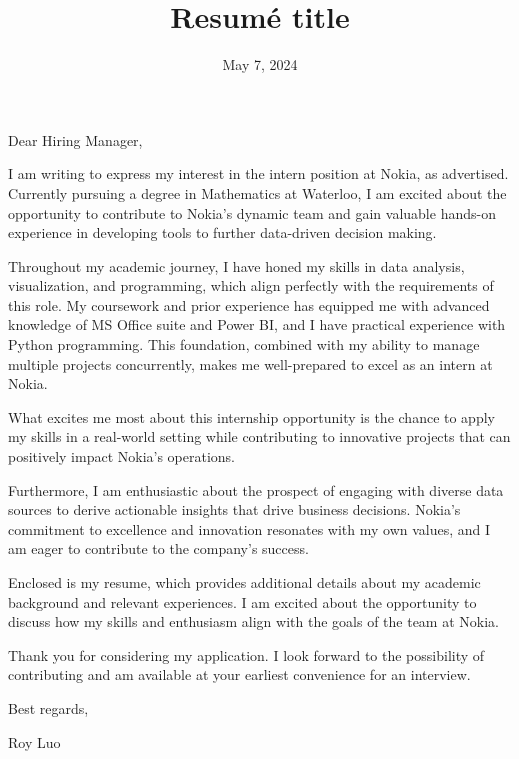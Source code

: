\documentclass[11pt,a4paper,roman]{moderncv}        %
\title{Resumé title}                               %
\date{May 7, 2024}                              %
\begin{document}
\recipient{\phantom{1}}{}
\opening{\phantom{1}}
\closing{\phantom{1}}
\enclosure[\phantom{1}]{\phantom{1}}          %
\makelettertitle

Dear Hiring Manager,

I am writing to express my interest in the intern position at Nokia, as advertised. Currently pursuing a degree in Mathematics at Waterloo, I am excited about the opportunity to contribute to Nokia's dynamic team and gain valuable hands-on experience in developing tools to further data-driven decision making.

Throughout my academic journey, I have honed my skills in data analysis, visualization, and programming, which align perfectly with the requirements of this role. My coursework and prior experience has equipped me with advanced knowledge of MS Office suite and Power BI, and I have practical experience with Python programming. This foundation, combined with my ability to manage multiple projects concurrently, makes me well-prepared to excel as an intern at Nokia.

What excites me most about this internship opportunity is the chance to apply my skills in a real-world setting while contributing to innovative projects that can positively impact Nokia's operations. 

Furthermore, I am enthusiastic about the prospect of engaging with diverse data sources to derive actionable insights that drive business decisions. Nokia's commitment to excellence and innovation resonates with my own values, and I am eager to contribute to the company's success.

Enclosed is my resume, which provides additional details about my academic background and relevant experiences. I am excited about the opportunity to discuss how my skills and enthusiasm align with the goals of the team at Nokia.

Thank you for considering my application. I look forward to the possibility of contributing and am available at your earliest convenience for an interview. 

Best regards,

Roy Luo


\vspace{0.5cm}
\end{document}
